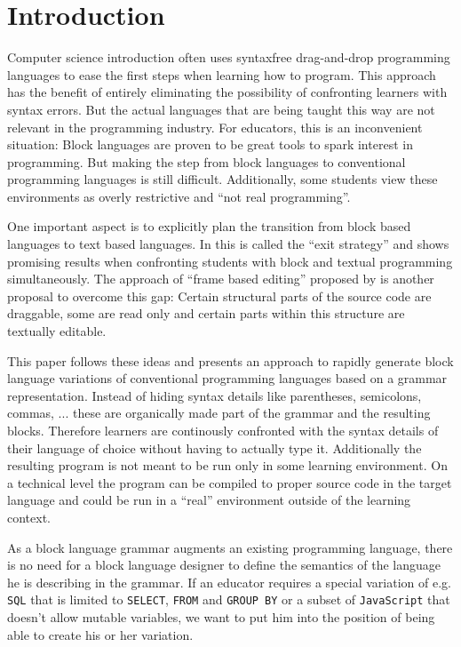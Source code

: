\documentclass[sigconf,natbib=false]{acmart}
\begin{document}
\section{Introduction}

Computer science introduction often uses syntaxfree drag-and-drop programming languages to ease the first steps when learning how to program. This approach has the benefit of entirely eliminating the possibility of confronting learners with syntax errors. But the actual languages that are being taught this way are not relevant in the programming industry. For educators, this is an inconvenient situation: Block languages are proven to be great tools to spark interest in programming. But making the step from block languages to conventional programming languages is still difficult. Additionally, some students view these environments as overly restrictive and \enquote{not real programming}\cite{braune_learning_2020}.

One important aspect is to explicitly plan the transition from block based languages to text based languages. In \cite{fraser_ten_2015} this is called the \enquote{exit strategy} and \cite{alrubaye_comparison_2019} shows promising results when confronting students with block and textual programming simultaneously. The approach of \enquote{frame based editing} proposed by \cite{kolling_frame-based_2015} is another proposal to overcome this gap: Certain structural parts of the source code are draggable, some are read only and certain parts within this structure are textually editable.

This paper follows these ideas and presents an approach to rapidly generate block language variations of conventional programming languages based on a grammar representation. Instead of hiding syntax details like parentheses, semicolons, commas, ... these are organically made part of the grammar and the resulting blocks. Therefore learners are continously confronted with the syntax details of their language of choice without having to actually type it. Additionally the resulting program is not meant to be run only in some learning environment. On a technical level the program can be compiled to proper source code in the target language and could be run in a \enquote{real} environment outside of the learning context.

As a block language grammar augments an existing programming language, there is no need for a block language designer to define the semantics of the language he is describing in the grammar. If an educator requires a special variation of e.g. \texttt{SQL} that is limited to \texttt{SELECT}, \texttt{FROM} and \texttt{GROUP BY} or a subset of \texttt{JavaScript} that doesn't allow mutable variables, we want to put him into the position of being able to create his or her variation.
\end{document}
